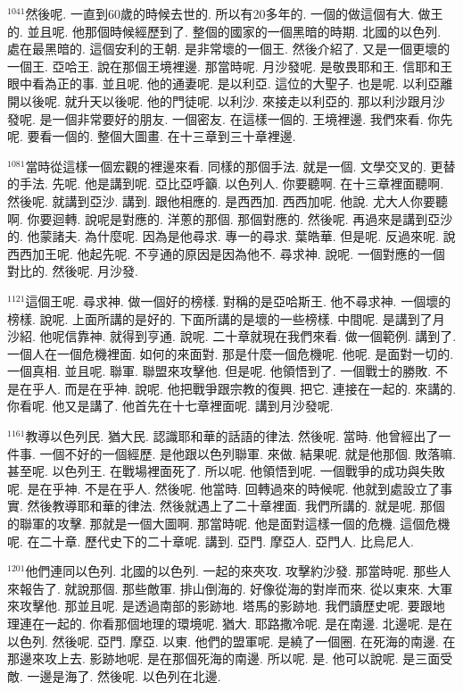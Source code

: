 \documentclass{book}
\begin{document}
$^{1041}$然後呢.
一直到60歲的時候去世的.
所以有20多年的.
一個的做這個有大.
做王的.
並且呢.
他那個時候經歷到了.
整個的國家的一個黑暗的時期.
北國的以色列.
處在最黑暗的.
這個安利的王朝.
是非常壞的一個王.
然後介紹了.
又是一個更壞的一個王.
亞哈王.
說在那個王境裡邊.
那當時呢.
月沙發呢.
是敬畏耶和王.
信耶和王眼中看為正的事.
並且呢.
他的通妻呢.
是以利亞.
這位的大聖子.
也是呢.
以利亞離開以後呢.
就升天以後呢.
他的門徒呢.
以利沙.
來接走以利亞的.
那以利沙跟月沙發呢.
是一個非常要好的朋友.
一個密友.
在這樣一個的.
王境裡邊.
我們來看.
你先呢.
要看一個的.
整個大圖畫.
在十三章到三十章裡邊.

$^{1081}$當時從這樣一個宏觀的裡邊來看.
同樣的那個手法.
就是一個.
文學交叉的.
更替的手法.
先呢.
他是講到呢.
亞比亞呼籲.
以色列人.
你要聽啊.
在十三章裡面聽啊.
然後呢.
就講到亞沙.
講到.
跟他相應的.
是西西加.
西西加呢.
他說.
尤大人你要聽啊.
你要迴轉.
說呢是對應的.
洋蔥的那個.
那個對應的.
然後呢.
再過來是講到亞沙的.
他蒙諸夫.
為什麼呢.
因為是他尋求.
專一的尋求.
葉皓華.
但是呢.
反過來呢.
說西西加王呢.
他起先呢.
不亨通的原因是因為他不.
尋求神.
說呢.
一個對應的一個對比的.
然後呢.
月沙發.

$^{1121}$這個王呢.
尋求神.
做一個好的榜樣.
對稱的是亞哈斯王.
他不尋求神.
一個壞的榜樣.
說呢.
上面所講的是好的.
下面所講的是壞的一些榜樣.
中間呢.
是講到了月沙紹.
他呢信靠神.
就得到亨通.
說呢.
二十章就現在我們來看.
做一個範例.
講到了.
一個人在一個危機裡面.
如何的來面對.
那是什麼一個危機呢.
他呢.
是面對一切的.
一個真相.
並且呢.
聯軍.
聯盟來攻擊他.
但是呢.
他領悟到了.
一個戰士的勝敗.
不是在乎人.
而是在乎神.
說呢.
他把戰爭跟宗教的復興.
把它.
連接在一起的.
來講的.
你看呢.
他又是講了.
他首先在十七章裡面呢.
講到月沙發呢.

$^{1161}$教導以色列民.
猶大民.
認識耶和華的話語的律法.
然後呢.
當時.
他曾經出了一件事.
一個不好的一個經歷.
是他跟以色列聯軍.
來做.
結果呢.
就是他那個.
敗落嘛.
甚至呢.
以色列王.
在戰場裡面死了.
所以呢.
他領悟到呢.
一個戰爭的成功與失敗呢.
是在乎神.
不是在乎人.
然後呢.
他當時.
回轉過來的時候呢.
他就到處設立了事實.
然後教導耶和華的律法.
然後就遇上了二十章裡面.
我們所講的.
就是呢.
那個的聯軍的攻擊.
那就是一個大圖啊.
那當時呢.
他是面對這樣一個的危機.
這個危機呢.
在二十章.
歷代史下的二十章呢.
講到.
亞門.
摩亞人.
亞門人.
比烏尼人.

$^{1201}$他們連同以色列.
北國的以色列.
一起的來夾攻.
攻擊約沙發.
那當時呢.
那些人來報告了.
就說那個.
那些敵軍.
排山倒海的.
好像從海的對岸而來.
從以東來.
大軍來攻擊他.
那並且呢.
是透過南部的影跡地.
塔馬的影跡地.
我們讀歷史呢.
要跟地理連在一起的.
你看那個地理的環境呢.
猶大.
耶路撒冷呢.
是在南邊.
北邊呢.
是在以色列.
然後呢.
亞門.
摩亞.
以東.
他們的盟軍呢.
是繞了一個圈.
在死海的南邊.
在那邊來攻上去.
影跡地呢.
是在那個死海的南邊.
所以呢.
是.
他可以說呢.
是三面受敵.
一邊是海了.
然後呢.
以色列在北邊.
\end{document}

